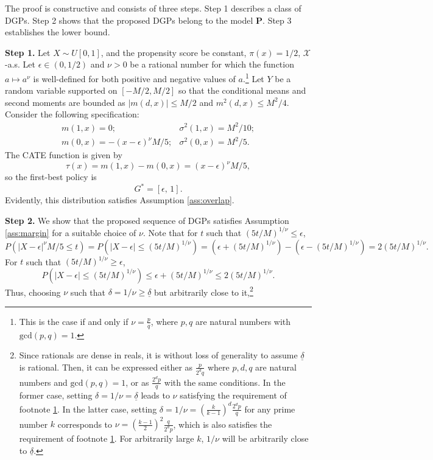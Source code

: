 \documentclass[12pt]{article}
\numberwithin{equation}{section}
\theoremstyle{plain}                         %
\theoremstyle{definition}                  %
\theoremstyle{remark}                      %
\begin{document}
The proof is constructive and consists of three steps. Step 1 describes a class of DGPs. Step 2 shows that the proposed DGPs belong to the model $\mathbf{P}$. Step 3 establishes the lower bound.


\textbf{Step 1.}  Let $X \sim U[0,1]$, and the propensity score be constant, $\pi(x) = 1/2$, $\mathcal{X}$-a.s. Let  $\epsilon \in (0, 1/2)$ and $\nu > 0$ be a rational number for which the function $a \mapsto a^{\nu}$ is well-defined for both positive and negative values of $a$.\footnote{This is the case if and only if $\nu = \frac{p}{q}$, where $p, q$ are natural numbers with $\text{gcd}(p, q) = 1$.\label{foot:nu_rest}} Let $Y$ be a random variable supported on $[-M/2, M/2]$ so that the conditional means and second moments are bounded as $|m(d, x)| \leq M/2$ and $m^2(d, x)\leq M^2/4$. Consider the following specification:
\begin{equation} \label{eq:prop2_dgp}
\begin{array}{ll}
		m(1,x) = 0; & \sigma^2(1,x) = M^2/10; \\
		m(0,x) = - (x-\epsilon)^{\nu} M/5; &\sigma^2(0,x) = M^2/5.
\end{array}
\end{equation}
The CATE function is given by
$$
\tau(x) = m(1,x) - m(0,x) = (x-\epsilon)^{\nu} M / 5,
$$
so the first-best policy is
$$
G^{*} = [\epsilon,\, 1].
$$
Evidently, this distribution satisfies Assumption \ref{ass:overlap}. \medskip 


\textbf{Step 2.}   We show that the proposed sequence of DGPs satisfies Assumption \ref{ass:margin} for a suitable choice of $\nu$. Note that for $t$ such that $(5t/M)^{1/\nu} \leq \epsilon$, 
$$
P (|X-\epsilon|^{\nu}M/5 \leq t) = P (|X-\epsilon| \leq (5t/M)^{1/\nu}) = (\epsilon + (5t/M)^{1/\nu}) - (\epsilon - (5t/M)^{1/\nu}) = 2(5t/M)^{1/\nu}.
$$
For $t$ such that $(5t/M)^{1/\nu} \geq \epsilon$,
$$
P (|X-\epsilon| \leq (5t/M)^{1/\nu}) \leq \epsilon + (5t/M)^{1/\nu} \leq 2(5t/M)^{1/\nu}.
$$
Thus, choosing $\nu$ such that $\delta = 1/\nu \geq \underline{\delta}$ but arbitrarily close to it,\footnote{Since rationals are dense in reals, it is without loss of generality to assume $\underline{\delta}$ is rational. Then, it can be expressed either as $\frac{p}{2^d q}$ where $p, d, q$ are natural numbers and $\text{gcd}(p, q) = 1$, or as $\frac{2^dp}{q}$ with the same conditions. In the former case, setting $\delta = 1/\nu = \underline{\delta}$ leads to $\nu$ satisfying the requirement of footnote \ref{foot:nu_rest}. In the latter case, setting $\delta = 1/\nu = \left( \frac{k}{k-1}\right)^d \frac{2^d p }{q}$ for any prime number $k$ corresponds to $\nu = \left(\frac{k-1}{2}\right)^2 \frac{q}{2^d p}$, which is also satisfies the requirement of footnote \ref{foot:nu_rest}. For arbitrarily large $k$, $1/\nu$ will be arbitrarily close to $\underline{\delta}$. } 
\end{document}
